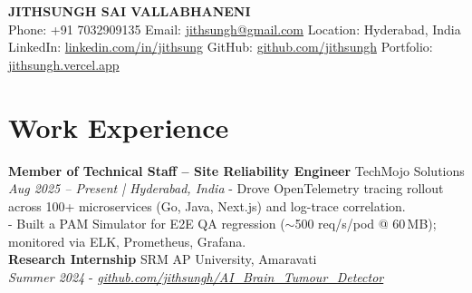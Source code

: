 \documentclass[a4paper,10pt]{article}
\begin{document}
\begin{center}
    {\LARGE \textbf{JITHSUNGH SAI VALLABHANENI}} \\[0.5em]

    \small 
    Phone: +91 7032909135 \quad
    Email: \href{mailto:jithsungh@gmail.com}{jithsungh@gmail.com} \quad
    Location: Hyderabad, India \\[0.3em]

    LinkedIn: \href{https://linkedin.com/in/jithsung}{linkedin.com/in/jithsung} \quad
    GitHub: \href{https://github.com/jithsungh}{github.com/jithsungh} \quad
    Portfolio: \href{https://jithsungh.vercel.app/}{jithsungh.vercel.app}
\end{center}
\section*{Work Experience}

\textbf{Member of Technical Staff – Site Reliability Engineer} \hfill TechMojo Solutions \\
\textit{Aug 2025 – Present | Hyderabad, India} \newline
- Drove OpenTelemetry tracing rollout across 100+ microservices (Go, Java, Next.js) and log-trace correlation. \\
- Built a PAM Simulator for E2E QA regression ($\sim$500 req/s/pod @ 60\,MB); monitored via ELK, Prometheus, Grafana. \\[0.8em]
\textbf{Research Internship} \hfill SRM AP University, Amaravati \\
\textit{Summer 2024} \newline
- \textit{\href{https://github.com/jithsungh/AI_Brain_Tumour_Detector}{github.com/jithsungh/AI\_Brain\_Tumour\_Detector}}
\end{document}
